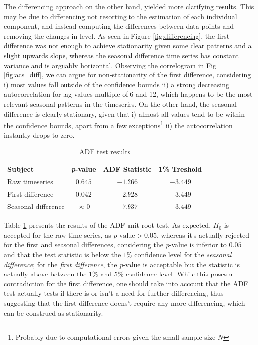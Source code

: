 \documentclass[conference]{IEEEtran}
\begin{document}
The differencing approach on the other hand, yielded more clarifying results. This may be due to differencing not resorting to the estimation of each individual component, and instead computing the differences between data points and removing the changes in level. As seen in Figure \ref{fig:differencing}, the first difference was not enough to achieve stationarity given some clear patterns and a slight upwards slope, whereas the seasonal difference time series has constant variance and is arguably horizontal. Observing the correlogram in Fig \ref{fig:acs_diff}, we can argue for non-stationarity of the first difference, considering i) most values fall outside of the confidence bounds ii) a strong decreasing autocorrelation for lag values multiple of 6 and 12, which happens to be the most relevant seasonal patterns in the timeseries. On the other hand, the seasonal difference is clearly stationary, given that i) almost all values tend to be within the confidence bounds, apart from a few exceptions\footnote{Probably due to computational errors given the small sample size $N$} ii) the autocorrelation instantly drops to zero.

\begin{table}[btp]
    \caption{ADF test results}
    \centering
    \begin{tabular}{l|c|c||c}
        Subject & \textit{p}-value & ADF Statistic & 1\% Treshold  \\
        \hline
        Raw timeseries & $0.645$  &  $-1.266$ & $-3.449$ \\
        First difference & \cellcolor{green!25} $0.042$ & $-2.928$ & $-3.449$ \\
        Seasonal difference & \cellcolor{green!25} $\approx 0$ & $-7.937$ & $-3.449$ \\
    \end{tabular}
    \label{tab:adfuller}
\end{table}

Table \ref{tab:adfuller} presents the results of the ADF unit root test. As expected, $H_0$ is accepted for the raw time series, as $p\text{-value}>0.05$, whereas it's actually rejected for the first and seasonal differences, considering the \textit{p}-value is inferior to $0.05$ and that the test statistic is below the $1\%$ confidence level for the \textit{seasonal difference}; for the \textit{first difference}, the \textit{p}-value is acceptable but the statistic is actually above between the $1\%$ and $5\%$ confidence level. While this poses a contradiction for the first difference, one should take into account that the ADF test actually tests if there is or isn't a need for further differencing, thus suggesting that the first difference doens't require any more differencing, which can be construed as stationarity.
\end{document}
